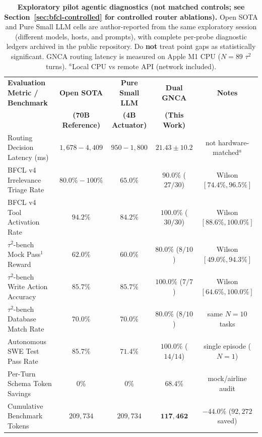 \documentclass[10pt,twocolumn,letterpaper]{article}
\begin{document}
\begin{table}[tbp]
\centering
\small
\setlength{\tabcolsep}{2.5pt}
\renewcommand{\arraystretch}{1.08}
\caption{\textbf{Exploratory pilot agentic diagnostics (not matched controls; see Section~\ref{sec:bfcl-controlled} for controlled router ablations).} Open SOTA and Pure Small LLM cells are author-reported from the same exploratory session (different models, hosts, and prompts), with complete per-probe diagnostic ledgers archived in the public repository. Do \textbf{not} treat point gaps as statistically significant. GNCA routing latency is measured on Apple M1 CPU ($N=89$ $\tau^2$ turns). $^a$Local CPU vs remote API (network included).}
\label{tab:live-benchmarks}
\vspace{8pt}
\begin{tabular*}{\textwidth}{@{\extracolsep{\fill}}lcccc@{}}
\toprule
\textbf{Evaluation Metric / Benchmark} & \textbf{Open SOTA} & \textbf{Pure Small LLM} & \textbf{Dual GNCA} & \textbf{Notes} \\
 & \textbf{(70B Reference)} & \textbf{(4B Actuator)} & \textbf{(This Work)} & \\
\midrule
Routing Decision Latency (ms) & $1{,}678 - 4{,}409$ & $950 - 1{,}800$ & $\mathbf{21.43 \pm 10.2}$ & not hardware-matched$^a$ \\
BFCL v4 Irrelevance Triage Rate & $80.0\% - 100\%$ & $65.0\%$ & $\mathbf{90.0\%}$ ($27/30$) & Wilson $[74.4\%, 96.5\%]$ \\
BFCL v4 Tool Activation Rate & $94.2\%$ & $84.2\%$ & $\mathbf{100.0\%}$ ($30/30$) & Wilson $[88.6\%, 100.0\%]$ \\
$\tau^2$-bench Mock Pass$^1$ Reward & $62.0\%$ & $60.0\%$ & $\mathbf{80.0\%}$ ($8/10$) & Wilson $[49.0\%, 94.3\%]$ \\
$\tau^2$-bench Write Action Accuracy & $85.7\%$ & $85.7\%$ & $\mathbf{100.0\%}$ ($7/7$) & Wilson $[64.6\%, 100.0\%]$ \\
$\tau^2$-bench Database Match Rate & $70.0\%$ & $70.0\%$ & $\mathbf{80.0\%}$ ($8/10$) & same $N{=}10$ tasks \\
Autonomous SWE Test Pass Rate & $85.7\%$ & $71.4\%$ & $\mathbf{100.0\%}$ ($14/14$) & single episode ($N{=}1$) \\
Per-Turn Schema Token Savings & $0\%$ & $0\%$ & $\mathbf{68.4\%}$ & mock/airline audit \\
Cumulative Benchmark Tokens & $209{,}734$ & $209{,}734$ & $\mathbf{117{,}462}$ & $-44.0\%$ ($92{,}272$ saved) \\
\bottomrule
\end{tabular*}
\end{table}
\end{document}
